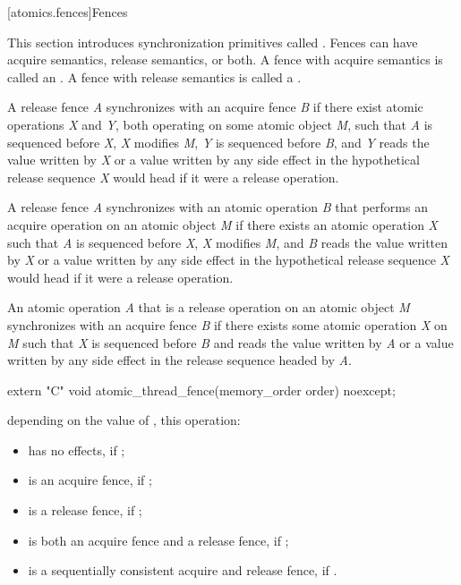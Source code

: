 [atomics.fences]{Fences}

\pnum
This section introduces synchronization primitives called . Fences can have
acquire semantics, release semantics, or both. A fence with acquire semantics is called
an . A fence with release semantics is called a .

\pnum
A release fence \textit{A} synchronizes with an acquire fence \textit{B} if there exist
atomic operations \textit{X} and \textit{Y}, both operating on some atomic object
\textit{M}, such that \textit{A} is sequenced before \textit{X}, \textit{X} modifies
\textit{M}, \textit{Y} is sequenced before \textit{B}, and \textit{Y} reads the value
written by \textit{X} or a value written by any side effect in the hypothetical release
sequence \textit{X} would head if it were a release operation.

\pnum
A release fence \textit{A} synchronizes with an atomic operation \textit{B} that
performs an acquire operation on an atomic object \textit{M} if there exists an atomic
operation \textit{X} such that \textit{A} is sequenced before \textit{X}, \textit{X}
modifies \textit{M}, and \textit{B} reads the value written by \textit{X} or a value
written by any side effect in the hypothetical release sequence \textit{X} would head if
it were a release operation.

\pnum
An atomic operation \textit{A} that is a release operation on an atomic object
\textit{M} synchronizes with an acquire fence \textit{B} if there exists some atomic
operation \textit{X} on \textit{M} such that \textit{X} is sequenced before \textit{B}
and reads the value written by \textit{A} or a value written by any side effect in the
release sequence headed by \textit{A}.

%
\begin{itemdecl}
extern "C" void atomic_thread_fence(memory_order order) noexcept;
\end{itemdecl}

\begin{itemdescr}
\pnum
\effects depending on the value of , this operation:

\begin{itemize}
\item has no effects, if ;

\item is an acquire fence, if ;

\item is a release fence, if ;

\item is both an acquire fence and a release fence, if ;

\item is a sequentially consistent acquire and release fence, if .
\end{itemize}
\end{itemdescr}

